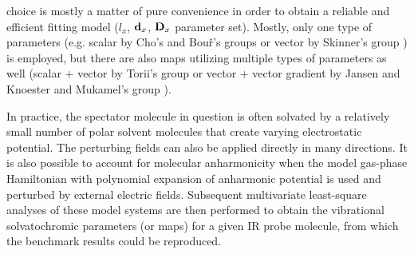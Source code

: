 \documentclass[a4paper,titlepage,twoside,fleqn,12pt]{book}
\begin{document}
\begin{refsection}
choice is mostly a matter of pure convenience in order to obtain a reliable and efficient
fitting model ($l_x$, ${\bf d}_x$, ${\bf D}_x$ parameter set). Mostly, only one type of parameters
(e.g. scalar by Cho's and Bou\v{r}'s groups \citep{Kwac.Cho.II.JCP.2003,Ham.Kim.Lee.Cho.JCP.2003,
Bour.Keiderling.JCP.2003,Hahn.Lee.Cho.JCP.2004,Kwac.Lee.Cho.JCP.2004,
Choi.Hahn.Cho.IJQC.2005,Kwac.Cho.JRS.2005,
Choi.Oh.Lee.Lee.Cho.JCP.2008,Oh.Choi.Lee.Han.Lee.Cho.JCP.2008,
Choi.Oh.Cho.JCP.2008,Lee.Choi.Cho.PCCP.2010,Choi.Cho.JCP.2011,
Choi.Raleigh.Cho.JPCL.2011,Lee.Choi.Cho.JCP.2012}
or vector by Skinner's group \citep{Schmidt.Corcelli.Skinner.JCP.2004,
Corcelli.Lawrence.Skinner.JCP.2004}) is employed, but there are also maps utilizing multiple types of parameters
as well (scalar + vector by Torii's group \citep{Torii.JPCL.2015,Torii.Noge.PCCP.2016} 
or vector + vector gradient by Jansen and Knoester \citep{Jansen.Knoester.JCP.2006}
and Mukamel's group \citep{Hayashi.Jansen.Zhuang.Mukamel.JPCA.2005,Hayashi.Zhuang.Mukamel.JPCA.2005}).
 
In practice, the spectator molecule in question is often solvated by a relatively small number of polar 
solvent molecules that create varying electrostatic potential.\citep{Bour.Keiderling.JCP.2003,
Lin.Shorb.Mukherjee.Zanni.Skinner.JPCB.2009,
Lee.Choi.Cho.JCP.2012} 
The perturbing fields can also be applied directly
in many directions.\citep{Jansen.Dijkstra.Watson.Hirst.Knoester.JCP.2006,
Jansen.Knoester.JCP.2006,Roy.Lessing.Meisl.Ganim.Tokmakoff.Knoester.Jansen.JCP.2011,
Hayashi.Jansen.Zhuang.Mukamel.JPCA.2005,
Hayashi.Zhuang.Mukamel.JPCA.2005,Bour.Michalik.Kapitan.JCP.2005} 
It is also possible to account for molecular anharmonicity
when the model gas\hyp{}phase Hamiltonian with polynomial expansion of anharmonic potential
is used and perturbed by external electric fields.\citep{Jansen.Knoester.JCP.2006}
Subsequent multivariate
least-square analyses of these model systems are then performed to obtain the vibrational 
solvatochromic parameters (or maps) for a given IR probe molecule, from which the benchmark
results could be reproduced. 


\end{refsection}
\end{document}
